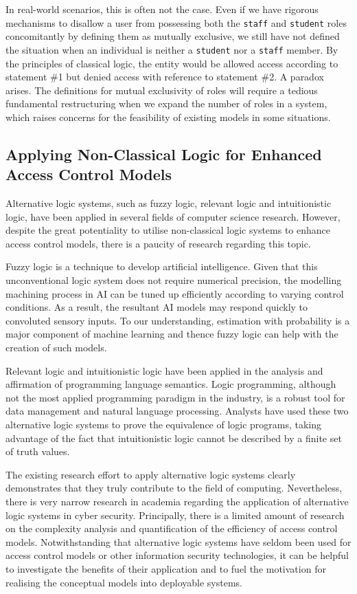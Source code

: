 \documentclass{article}
\begin{document}
In real-world scenarios, this is often not the case. Even if we have rigorous mechanisms to disallow a user from possessing both the \texttt{staff} and \texttt{student} roles concomitantly by defining them as mutually exclusive, we still have not defined the situation when an individual is neither a \texttt{student} nor a \texttt{staff} member. By the principles of classical logic, the entity would be allowed access according to statement \#1 but denied access with reference to statement \#2. A paradox arises. The definitions for mutual exclusivity of roles will require a tedious fundamental restructuring when we expand the number of roles in a system, which raises concerns for the feasibility of existing models in some situations.

\subsection{Applying Non-Classical Logic for Enhanced Access Control Models}

Alternative logic systems, such as fuzzy logic, relevant logic and intuitionistic logic, have been applied in several fields of computer science research. However, despite the great potentiality to utilise non-classical logic systems to enhance access control models, there is a paucity of research regarding this topic.

Fuzzy logic is a technique to develop artificial intelligence. Given that this unconventional logic system does not require numerical precision, the modelling machining process in AI can be tuned up efficiently according to varying control conditions. As a result, the resultant AI models may respond quickly to convoluted sensory inputs.\cite{fuzzy-logic-ai} To our understanding, estimation with probability is a major component of machine learning and thence fuzzy logic can help with the creation of such models.

Relevant logic and intuitionistic logic have been applied in the analysis and affirmation of programming language semantics. Logic programming, although not the most applied programming paradigm in the industry, is a robust tool for data management and natural language processing. Analysts have used these two alternative logic systems to prove the equivalence of logic programs, taking advantage of the fact that intuitionistic logic cannot be described by a finite set of truth values.\cite{logic-programs}

The existing research effort to apply alternative logic systems clearly demonstrates that they truly contribute to the field of computing. Nevertheless, there is very narrow research in academia regarding the application of alternative logic systems in cyber security. Principally, there is a limited amount of research on the complexity analysis and quantification of the efficiency of access control models. Notwithstanding that alternative logic systems have seldom been used for access control models or other information security technologies, it can be helpful to investigate the benefits of their application and to fuel the motivation for realising the conceptual models into deployable systems.
\end{document}
